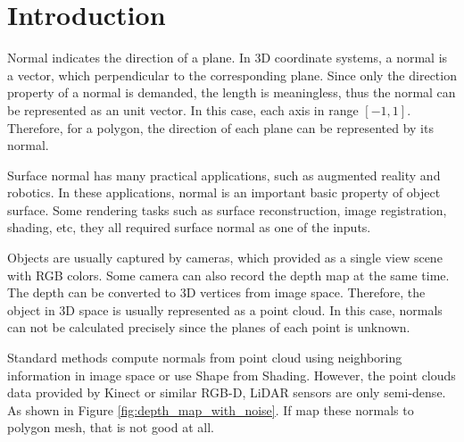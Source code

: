 
\section{Introduction}

Normal indicates the direction of a plane. In 3D coordinate systems, a normal is a vector, which perpendicular to the corresponding plane. Since only the direction property of a normal is demanded, the length is meaningless, thus the normal can be represented as an unit vector. In this case, each axis in range $ [-1,1] $. Therefore, for a polygon, the direction of each plane can be represented by its normal. 


Surface normal has many practical applications, such as augmented reality and robotics. In these applications, normal is an important basic property of object surface. Some rendering tasks such as surface reconstruction, image registration, shading, etc, they all required surface normal as one of the inputs. 

Objects are usually captured by cameras, which provided as a single view scene with RGB colors. Some camera can also record the depth map at the same time. The depth can be converted to 3D vertices from image space. Therefore, the object in 3D space is usually represented as a point cloud. In this case, normals can not be calculated precisely since the planes of each point is unknown.




Standard methods compute normals from point cloud using neighboring information in image space or use Shape from Shading. However, the point clouds data provided by Kinect or similar RGB-D, LiDAR sensors are only semi-dense. As shown in Figure \ref{fig:depth_map_with_noise}. If map these normals to polygon mesh, that is not good at all. 

